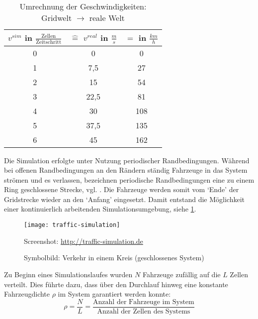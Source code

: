 \begin{table}[ht]
\begin{center}
\setlength{\tabcolsep}{0.5em} %
{\renewcommand{\arraystretch}{1.2}%
\begin{tabular}{| c | c | c |}
\hline 
$v^{sim}$ in $\frac{\text{Zellen}}{\text{Zeitschritt}}$ & $\widehat{=}$ $v^{real}$ in $\frac{m}{s}$ & $=$ in $\frac{km}{h}$ \\ \hline 
0 & 0 & 0 \\ \hline
1 & 7,5 & 27 \\ \hline
2 & 15 & 54 \\ \hline
3 & 22,5 & 81 \\ \hline
4 & 30 & 108 \\ \hline
5 & 37,5 & 135 \\ \hline
6 & 45 & 162 \\ \hline
\end{tabular}
}
\caption{Umrechnung der Geschwindigkeiten: Gridwelt $\rightarrow$ reale Welt}
\end{center}
\label{tab:umrechnung-zelle-kmh}
\end{table}

Die Simulation erfolgte unter Nutzung periodischer Randbedingungen. 
Während bei offenen Randbedingungen an den Rändern ständig Fahrzeuge in das System strömen und es verlassen, bezeichnen periodische Randbedingungen eine zu einem Ring geschlossene Strecke, vgl. \cite[S. 6]{spahn-da}.
Die Fahrzeuge werden somit vom \enquote*{Ende} der Gridstrecke wieder an den \enquote*{Anfang} eingesetzt. 
Damit entstand die Möglichkeit einer kontinuierlich arbeitenden Simulationsumgebung, siehe \cref{figure:traffic-simulation}.

\begin{figure}[hptb]
 \centering
 \texttt{[image: traffic-simulation]}
 \caption[Darstellung des Verkehrs in einem geschlossenen System]
 		{Symbolbild: Verkehr in einem Kreis (geschlossenes System)}{\footnotesize Screenshot: \url{http://traffic-simulation.de}}
 \label{figure:traffic-simulation}
\end{figure} 

Zu Beginn eines Simulationslaufes wurden $N$ Fahrzeuge zufällig auf die $L$ Zellen verteilt.
Dies führte dazu, dass über den Durchlauf hinweg eine konstante Fahrzeugdichte $\rho$ im System garantiert werden konnte:
\begin{equation}
\rho = \dfrac{N}{L} = \dfrac{\text{Anzahl der Fahrzeuge im System}}{\text{Anzahl der Zellen des Systems}}
\nonumber
\end{equation}




